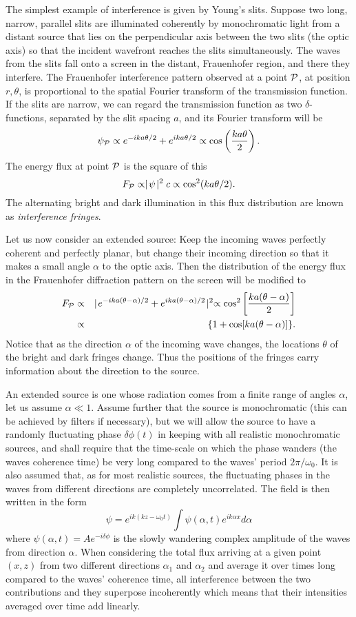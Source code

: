 \documentclass{article}
\newcommand{\bua}{\begin{eqnarray*}}
\newcommand{\eua}{\end{eqnarray*}}
\def\cl#1{{\cal #1}}               %
\def\labs{\mid\!}
\def\rabs{\!\mid}
\begin{document}
The simplest example of interference is given by Young's slits. Suppose two long,
narrow, parallel slits are illuminated coherently by monochromatic light from a distant
source that lies on the perpendicular axis between the two slits (the optic axis) so that the incident wavefront reaches the slits simultaneously. The waves from the slits fall onto a screen in the distant, Frauenhofer region, and there they interfere. The Frauenhofer 
interference pattern observed at a point $\cl{P}$, at position $r,\theta$, is proportional to the spatial Fourier transform of the transmission function. If the slits are 
narrow, we can regard the transmission function as two $\delta$-functions, separated
by the slit spacing $a$, and its Fourier transform will be
\[
\psi_{\cl{P}}\propto e^{-ika\theta/2}+e^{ika\theta/2}\propto\cos\left({ka\theta\over 2}\right).
\]
The energy flux at point $\cl{P}$ is the square of this
\[
F_{\cl{P}}\propto\labs\psi\rabs^2c\propto\cos^2({ka\theta/2}).
\]
The alternating bright and dark illumination in this flux distribution are known as {\it interference fringes}. 

Let us now consider an extended source: Keep the incoming waves perfectly 
coherent and perfectly planar, but change their incoming direction so that it makes a small angle $\alpha$ to the optic axis. Then the distribution of the energy flux in the
Frauenhofer diffraction pattern on the screen will be modified to 
\bua
F_{\cl{P}}&\propto&\labs e^{-ika(\theta-\alpha)/2}+e^{ika(\theta-\alpha)/2}\rabs^2
      \propto\cos^2\left[{ka(\theta-\alpha)\over 2}\right] \\
             &\propto& \{1+\cos[ka(\theta-\alpha)]\}.
\eua
Notice that as the direction $\alpha$ of the incoming wave changes, the locations $\theta$ of the bright and dark fringes change. Thus the positions of the fringes carry information about the direction to the source. 

An extended source is one whose radiation comes from a finite range of angles $\alpha$, let us assume $\alpha\ll 1$. Assume further that the source is monochromatic (this can be achieved by filters if necessary), but we will allow the source to have a 
randomly fluctuating phase $\delta\phi(t)$ in keeping with all realistic monochromatic sources, and shall require that the time-scale on which the phase wanders (the waves coherence time) be very long compared to the waves' period $2\pi/\omega_0$. It is also assumed that, as for most realistic sources, the fluctuating phases in the waves from different directions are completely uncorrelated. The field is then written in the 
form
\[
\psi=e^{ik(kz-\omega_0t)}\int\psi(\alpha,t)e^{ik\alpha x}d\alpha
\]
where $\psi(\alpha,t)=Ae^{-i\delta\phi}$ is the slowly wandering complex amplitude of the waves from direction $\alpha$. When considering the total flux arriving at a given point $(x,z)$ from two different directions $\alpha_1$ and $\alpha_2$ and average it over times long compared to the waves' coherence time, all interference between the two contributions and they superpose incoherently which means that their intensities averaged over time add linearly.
\end{document}
